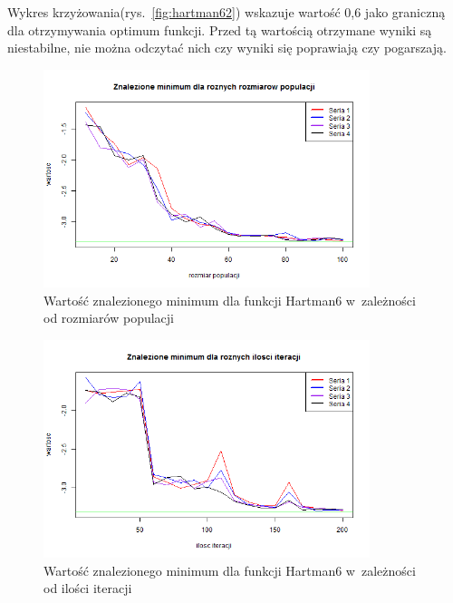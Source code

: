 \documentclass[11pt, a4paper]{article}
\newcommand{\fbi}{\leavevmode{\parindent=1em\indent}}
\begin{document}
\fbi
Wykres krzyżowania(rys.~\ref{fig:hartman62}) wskazuje wartość 0,6 jako graniczną dla otrzymywania optimum funkcji. Przed tą wartością otrzymane wyniki są niestabilne, nie można odczytać nich czy wyniki się poprawiają czy pogarszają.

\begin{figure}[H]
	\begin{center}
		\includegraphics[width=0.85\textwidth]{./assets/Hartman64.png}
		\caption{Wartość znalezionego minimum dla funkcji Hartman6 w~zależności od rozmiarów populacji}
		\label{fig:hartman64}
	\end{center}
\end{figure}


\begin{figure}[H]
	\begin{center}
		\includegraphics[width=0.85\textwidth]{./assets/Hartman65.png}
		\caption{Wartość znalezionego minimum dla funkcji Hartman6 w~zależności od ilości iteracji}
		\label{fig:hartman65}
	\end{center}
\end{figure}
\end{document}
